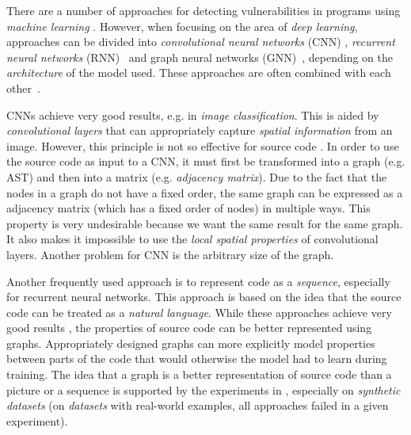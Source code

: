 There are a number of approaches for detecting vulnerabilities in programs using \textit{machine learning} \cite{taxonomy-hanif2021rise}. However, when focusing on the area of \textit{deep learning}, approaches can be divided into \textit{convolutional neural networks} (CNN) \cite{CNN1-MIX-duan2019vulsniper}, \textit{recurrent neural networks} (RNN)~\cite{RNN5-li2021vuldeelocator, RNN2-li2021sysevr, RNN3-li2018vuldeepecker, RNN6-lin2017poster, RNN7-saccente2019project, RNN4-zou2019mu} and graph neural networks (GNN)~\cite{GNN1-cao2021bgnn4vd, GNN3-cheng2021deepwukong, GNN6-ganz2021explaining, GNN5-vsikic2022graph, GNN4-IBM-suneja2020learning, GNN2-zhou2019devign}, depending on the \textit{architecture} of the model used. These approaches are often combined with each other~\cite{GNN8-RNN-fang2022jstrong, CNN1-RNN-li2020automated, GNN7-RNN-rabheru2020hybrid, RNN1-CNN-russell2018automated}.

CNNs achieve very good results, e.g. in \textit{image classification}. This is aided by \textit{convolutional layers} that can appropriately capture \textit{spatial information} from an image. However, this principle is not so effective for source code \cite{gnn-usage}. In order to use the source code as input to a CNN, it must first be transformed into a graph (e.g. AST) and then into a matrix (e.g. \textit{adjacency matrix}). Due to the fact that the nodes in a graph do not have a fixed order, the same graph can be expressed as a adjacency matrix (which has a fixed order of nodes) in multiple ways. This property is very undesirable because we want the same result for the same graph. It also makes it impossible to use the \textit{local spatial properties} of convolutional layers. Another problem for CNN is the arbitrary size of the graph.

Another frequently used approach is to represent code as a \textit{sequence}, especially for recurrent neural networks. This approach is based on the idea that the source code can be treated as a \textit{natural language}. While these approaches achieve very good results \cite{NLP-APPROACH1-buratti2020exploring, NLP-APPROACH2-hanif2022vulberta}, the properties of source code can be better represented using graphs. Appropriately designed graphs can more explicitly model properties between parts of the code that would otherwise the model had to learn during training. The idea that a graph is a better representation of source code than a picture or a sequence is supported by the experiments in \cite{GNN4-IBM-suneja2020learning}, especially on \textit{synthetic datasets} (on \textit{datasets} with real-world examples, all approaches failed in a given experiment).

